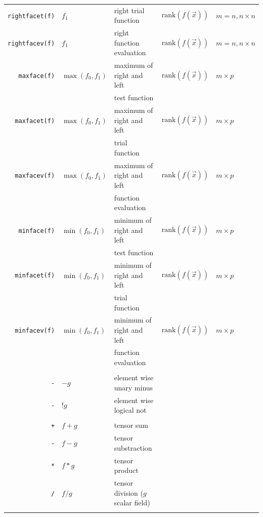 \documentclass[11pt]{article}
\begin{document}
\begin{longtable}[c]{rllll}
  \lstinline!rightfacet(f)! & $f_1$ & right  trial function & $\mathrm{rank}( f(\overrightarrow{x}))$   & $m=n, n\times n$\\
  \lstinline!rightfacev(f)! & $f_1$ & right   function evaluation & $\mathrm{rank}( f(\overrightarrow{x}))$   & $m=n, n\times n$\\

  \lstinline!maxface(f)! & $\max(f_0,f_1)$ & maximum of right and left & $\mathrm{rank}( f(\overrightarrow{x}))$   & $m\times p$\\
  && test   function&&\\
  \lstinline!maxfacet(f)! & $\max(f_0,f_1)$ & maximum of right and left & $\mathrm{rank}( f(\overrightarrow{x}))$   & $m\times p$\\
  && trial   function&&\\
  \lstinline!maxfacev(f)! & $\max(f_0,f_1)$ & maximum of right and left & $\mathrm{rank}( f(\overrightarrow{x}))$   & $m\times p$\\
  && function evaluation&&\\
  \lstinline!minface(f)! & $\min(f_0,f_1)$ & minimum of right and left & $\mathrm{rank}( f(\overrightarrow{x}))$   & $m\times p$\\
  && test   function&&\\
  \lstinline!minfacet(f)! & $\min(f_0,f_1)$ & minimum of right and left & $\mathrm{rank}( f(\overrightarrow{x}))$   & $m\times p$\\
  && trial   function&&\\
  \lstinline!minfacev(f)! & $\min(f_0,f_1)$ & minimum of right and left & $\mathrm{rank}( f(\overrightarrow{x}))$   & $m\times p$\\
  && function evaluation&&\\
  \hline\\
  \lstinline!-! & $-g$ & element wise unary minus  & & \\
  \lstinline!-! & $!g$ & element wise logical not  & & \\\hline\\

  \lstinline!+! & $f+g$ & tensor sum  & & \\
  \lstinline!-! & $f-g$ & tensor substraction  & & \\
  \lstinline!*! & $f*g$ & tensor product  & & \\
  \lstinline!/! & $f/g$ & tensor division ($g$ scalar field)  & & \\\hline\\


\end{longtable}
\end{document}
